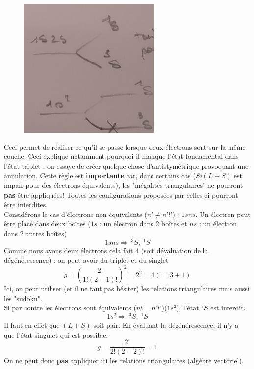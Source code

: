 	\begin{figure}
	\vspace{-7mm}
	\includegraphics[scale=0.3]{ch3/image4}
	\end{figure}
	
Ceci permet de réaliser ce qu'il se passe lorsque deux électrons sont sur la même couche. Ceci 
explique notamment pourquoi il manque l'état fondamental dans l'état triplet : on essaye de créer 
quelque chose d'antistymétrique provoquant une annulation. Cette règle est \textbf{importante} car,
dans certains cas ($Si (L+S)$ est impair pour des électrons équivalents), les "inégalités
triangulaires" ne pourront \textbf{pas} être appliquées! Toutes les configurations proposées par
celles-ci pourront être interdites.\\

Considérons le cas d’électrons non-équivalents ($nl\neq n’l’$) : $1sns$. Un électron peut être placé dans deux boîtes ($1s$ : un électron dans 2 boîtes et $ns$ : un électron dans 2 autres boîtes)
\begin{equation}
1sns \Rightarrow \; ^3S, \; ^1S 
\end{equation}
Comme nous avons deux électrons cela fait 4 (soit dévaluation de la dégénérescence) : on peut avoir du triplet et du singlet
\begin{equation}
g =  \left( \frac{2!}{1!(2-1)!} \right) ^2 = 2^2 = 4 (=3+1)
\end{equation}
Ici, on peut utiliser (et il ne faut pas hésiter) les relations triangulaires mais aussi les 
"sudoku".\\

Si par contre les électrons sont équivalents ($nl = n’l’$)($1s^2$), l'état $^3S$ est interdit. 
\begin{equation}
1s^2 \Rightarrow \; ^3S, \; ^1S
\end{equation}
Il faut en effet que $(L+S)$ soit pair. En évaluant la dégénérescence, il n'y a que l'état singulet qui est possible. 
\begin{equation}
g =   \frac{2!}{2!(2-2)!}  = 1
\end{equation}
On ne peut donc \textbf{pas} appliquer ici les relations triangulaires (algèbre vectoriel).

